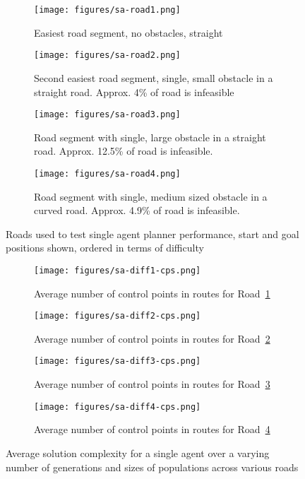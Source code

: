 \begin{figure}
  \centering
  \begin{subfigure}[b]{0.44\textwidth}
    \centering
    \texttt{[image: figures/sa-road1.png]}
    \caption{\label{subfig:sa-road1}Easiest road segment, no obstacles, straight}
  \end{subfigure}
  \begin{subfigure}[b]{0.44\textwidth}
    \centering
    \texttt{[image: figures/sa-road2.png]}
    \caption{\label{subfig:sa-road2}Second easiest road segment, single, small obstacle in a straight road. Approx. 4\% of road is infeasible}
  \end{subfigure}
  \begin{subfigure}[b]{0.44\textwidth}
    \centering
    \texttt{[image: figures/sa-road3.png]}
    \caption{\label{subfig:sa-road3}Road segment with single, large obstacle in a straight road. Approx. 12.5\% of road is infeasible.}
  \end{subfigure}
  \begin{subfigure}[b]{0.44\textwidth}
    \centering
    \texttt{[image: figures/sa-road4.png]}
    \caption{\label{subfig:sa-road4}Road segment with single, medium sized obstacle in a curved road. Approx. 4.9\% of road is infeasible.}
  \end{subfigure}
  \caption{\label{fig:single-agent-roads} Roads used to test single agent planner performance, start and goal positions shown, ordered in terms of difficulty}
\end{figure}

\begin{figure}
  \centering
  \begin{subfigure}[b]{0.44\textwidth}
    \centering
    \texttt{[image: figures/sa-diff1-cps.png]}
    \caption{\label{subfig:sa-diff1-cps}Average number of control points in routes for Road~\ref{subfig:sa-road1}}
  \end{subfigure}
  \begin{subfigure}[b]{0.44\textwidth}
    \centering
    \texttt{[image: figures/sa-diff2-cps.png]}
    \caption{\label{subfig:sa-diff2-cps}Average number of control points in routes for Road~\ref{subfig:sa-road2}}
  \end{subfigure}
  \begin{subfigure}[b]{0.44\textwidth}
    \centering
    \texttt{[image: figures/sa-diff3-cps.png]}
    \caption{\label{subfig:sa-diff3-cps}Average number of control points in routes for Road~\ref{subfig:sa-road3}}
  \end{subfigure}
  \begin{subfigure}[b]{0.44\textwidth}
    \centering
    \texttt{[image: figures/sa-diff4-cps.png]}
    \caption{\label{subfig:sa-diff4-cps}Average number of control points in routes for Road~\ref{subfig:sa-road4}}
  \end{subfigure}
  \caption{\label{fig:single-agent-cps} Average solution complexity for a single agent over a varying number of generations and sizes of populations across various roads }
\end{figure}

